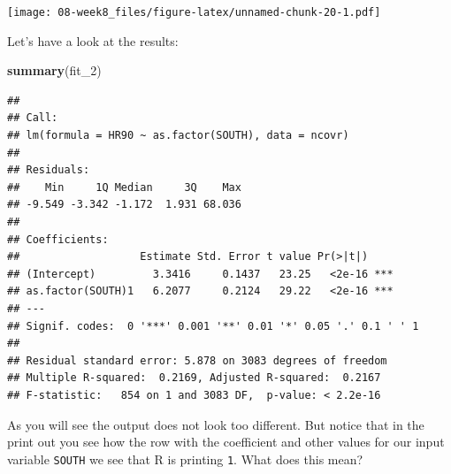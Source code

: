 \documentclass[]{book}
\newenvironment{Shaded}{\begin{snugshade}}{\end{snugshade}}
\newcommand{\DataTypeTok}[1]{\textcolor[rgb]{0.13,0.29,0.53}{#1}}
\newcommand{\DecValTok}[1]{\textcolor[rgb]{0.00,0.00,0.81}{#1}}
\newcommand{\KeywordTok}[1]{\textcolor[rgb]{0.13,0.29,0.53}{\textbf{#1}}}
\newcommand{\NormalTok}[1]{#1}
\newcommand{\OperatorTok}[1]{\textcolor[rgb]{0.81,0.36,0.00}{\textbf{#1}}}
\newcommand{\StringTok}[1]{\textcolor[rgb]{0.31,0.60,0.02}{#1}}
\begin{document}
\begin{Shaded}
\end{Shaded}

\texttt{[image: 08-week8\_files/figure-latex/unnamed-chunk-20-1.pdf]}

Let's have a look at the results:

\begin{Shaded}
\begin{Highlighting}[]
\KeywordTok{summary}\NormalTok{(fit_}\DecValTok{2}\NormalTok{)}
\end{Highlighting}
\end{Shaded}

\begin{verbatim}
## 
## Call:
## lm(formula = HR90 ~ as.factor(SOUTH), data = ncovr)
## 
## Residuals:
##    Min     1Q Median     3Q    Max 
## -9.549 -3.342 -1.172  1.931 68.036 
## 
## Coefficients:
##                   Estimate Std. Error t value Pr(>|t|)    
## (Intercept)         3.3416     0.1437   23.25   <2e-16 ***
## as.factor(SOUTH)1   6.2077     0.2124   29.22   <2e-16 ***
## ---
## Signif. codes:  0 '***' 0.001 '**' 0.01 '*' 0.05 '.' 0.1 ' ' 1
## 
## Residual standard error: 5.878 on 3083 degrees of freedom
## Multiple R-squared:  0.2169, Adjusted R-squared:  0.2167 
## F-statistic:   854 on 1 and 3083 DF,  p-value: < 2.2e-16
\end{verbatim}

As you will see the output does not look too different. But notice that in the print out you see how the row with the coefficient and other values for our input variable \texttt{SOUTH} we see that R is printing \texttt{1}. What does this mean?
\end{document}
